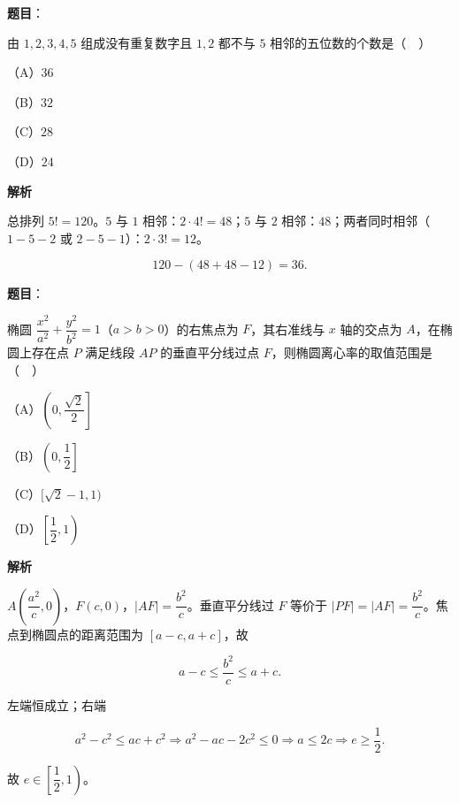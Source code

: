 \begin{answer}

\textbf{题目}：

由 $1,2,3,4,5$ 组成没有重复数字且 $1,2$ 都不与 $5$ 相邻的五位数的个数是（　）

（A）$36$

（B）$32$

（C）$28$

（D）$24$

\textbf{解析}

总排列 $5!=120$。$5$ 与 $1$ 相邻：$2\cdot4!=48$；$5$ 与 $2$ 相邻：$48$；两者同时相邻（$1-5-2$ 或 $2-5-1$）：$2\cdot3!=12$。

\nopagebreak[4]
\[120-(48+48-12)=36.\]


\end{answer}
\begin{answer}

\textbf{题目}：

椭圆 $\dfrac{x^2}{a^2}+\dfrac{y^2}{b^2}=1$（$a>b>0$）的右焦点为 $F$，其右准线与 $x$ 轴的交点为 $A$，在椭圆上存在点 $P$ 满足线段 $AP$ 的垂直平分线过点 $F$，则椭圆离心率的取值范围是（　）

（A）$\left(0,\dfrac{\sqrt2}2\right]$

（B）$\left(0,\dfrac12\right]$

（C）$[\sqrt2-1,1)$

（D）$\left[\dfrac12,1\right)$

\textbf{解析}

$A\left(\dfrac{a^2}c,0\right)$，$F(c,0)$，$|AF|=\dfrac{b^2}c$。垂直平分线过 $F$ 等价于 $|PF|=|AF|=\dfrac{b^2}c$。焦点到椭圆点的距离范围为 $[a-c,a+c]$，故

\nopagebreak[4]
\[a-c\leqslant\frac{b^2}c\leqslant a+c.\]

左端恒成立；右端

\nopagebreak[4]
\[a^2-c^2\leqslant ac+c^2\Longrightarrow a^2-ac-2c^2\leqslant0
\Longrightarrow a\leqslant2c\Longrightarrow e\geqslant\frac12.\]

故 $e\in\left[\dfrac12,1\right)$。


\end{answer}
